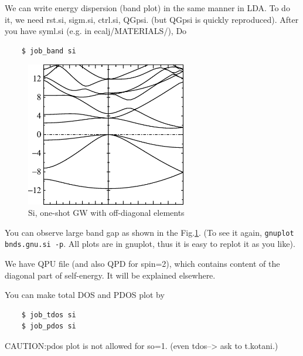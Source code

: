 We can write energy dispersion (band plot) in the same manner in LDA.
To do it, we need rst.si, sigm.si, ctrl.si, QGpsi.
(but QGpsi is quickly reproduced). After you have syml.si
(e.g. in ecalj/MATERIALS/), Do
\begin{verbatim}
    $ job_band si
\end{verbatim}

\begin{figure}[h]
 \begin{center}
  \includegraphics[width=70mm]{img/bandoneshotsi.eps}
  \caption{Si, one-shot GW with off-diagonal elements}
 \end{center}
\label{sigwscone}
\end{figure}
You can observe large band gap as shown in the Fig.\ref{sigwscone}.
(To see it again, \verb+gnuplot bnds.gnu.si -p+.
All plots are in gnuplot, thus it is easy to replot it as you like).

We have QPU file (and also QPD for spin=2), which contains content
of the diagonal part of self-energy. It will be explained elsewhere.

You can make total DOS and PDOS plot by 
\begin{verbatim}
    $ job_tdos si
    $ job_pdos si
\end{verbatim}
CAUTION:pdos plot is not allowed for so=1. (even tdos--> ask to t.kotani.)\\

